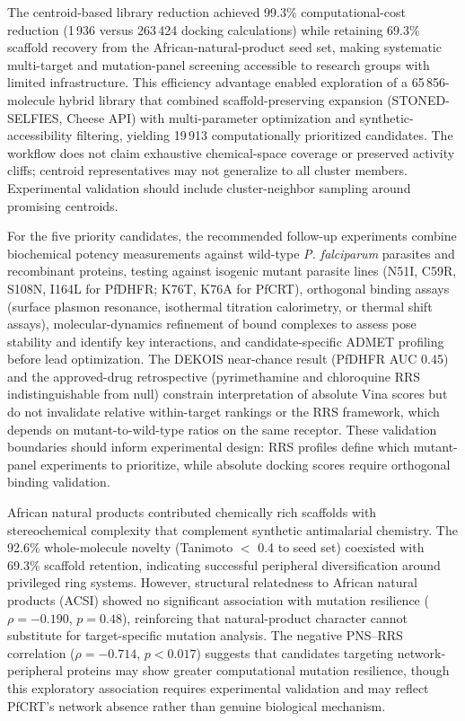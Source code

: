 \documentclass[11pt,a4paper]{article}
\begin{document}
The centroid-based library reduction achieved 99.3\% computational-cost reduction (1\,936 versus 263\,424 docking calculations) while retaining 69.3\% scaffold recovery from the African-natural-product seed set, making systematic multi-target and mutation-panel screening accessible to research groups with limited infrastructure. This efficiency advantage enabled exploration of a 65\,856-molecule hybrid library that combined scaffold-preserving expansion (STONED-SELFIES, Cheese API) with multi-parameter optimization and synthetic-accessibility filtering, yielding 19\,913 computationally prioritized candidates. The workflow does not claim exhaustive chemical-space coverage or preserved activity cliffs; centroid representatives may not generalize to all cluster members. Experimental validation should include cluster-neighbor sampling around promising centroids.

For the five priority candidates, the recommended follow-up experiments combine biochemical potency measurements against wild-type \emph{P. falciparum} parasites and recombinant proteins, testing against isogenic mutant parasite lines (N51I, C59R, S108N, I164L for PfDHFR; K76T, K76A for PfCRT), orthogonal binding assays (surface plasmon resonance, isothermal titration calorimetry, or thermal shift assays), molecular-dynamics refinement of bound complexes to assess pose stability and identify key interactions, and candidate-specific ADMET profiling before lead optimization. The DEKOIS near-chance result (PfDHFR AUC 0.45) and the approved-drug retrospective (pyrimethamine and chloroquine RRS indistinguishable from null) constrain interpretation of absolute Vina scores but do not invalidate relative within-target rankings or the RRS framework, which depends on mutant-to-wild-type ratios on the same receptor. These validation boundaries should inform experimental design: RRS profiles define which mutant-panel experiments to prioritize, while absolute docking scores require orthogonal binding validation.

African natural products contributed chemically rich scaffolds with stereochemical complexity that complement synthetic antimalarial chemistry. The 92.6\% whole-molecule novelty (Tanimoto $<$ 0.4 to seed set) coexisted with 69.3\% scaffold retention, indicating successful peripheral diversification around privileged ring systems. However, structural relatedness to African natural products (ACSI) showed no significant association with mutation resilience ($\rho = -0.190$, $p = 0.48$), reinforcing that natural-product character cannot substitute for target-specific mutation analysis. The negative PNS--RRS correlation ($\rho = -0.714$, $p < 0.017$) suggests that candidates targeting network-peripheral proteins may show greater computational mutation resilience, though this exploratory association requires experimental validation and may reflect PfCRT's network absence rather than genuine biological mechanism.
\end{document}
